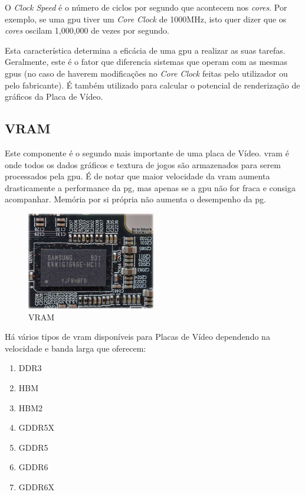 \documentclass{report}
\begin{document}
O \textit{Clock Speed} é o número de ciclos por segundo que acontecem nos \textit{cores}. Por exemplo, se uma \ac{gpu} tiver um \textit{Core Clock} de 1000MHz, isto quer dizer que os \textit{cores} oscilam 1,000,000 de vezes por segundo. 

Esta característica determina a eficácia de uma \ac{gpu} a realizar as suas tarefas. Geralmente, este é o fator que diferencia sistemas que operam com as mesmas \acp{gpu} ({\footnotesize no caso de haverem modificações no \textit{Core Clock} feitas pelo utilizador ou pelo fabricante}). É também utilizado para calcular o potencial de renderização de gráficos da Placa de Vídeo.
\clearpage

\subsection{VRAM}
\label{sec.mem}
Este componente é o segundo mais importante de uma placa de Vídeo. \ac{vram} é onde todos os dados gráficos e textura de jogos são armazenados para serem processados pela \ac{gpu}. É de notar que maior velocidade da \ac{vram} aumenta drasticamente a performance da \ac{pg}, mas apenas se a \ac{gpu} não for fraca e consiga acompanhar. Memória por si própria não aumenta o desempenho da \ac{pg}.

\begin{figure}[h]
\centering
\includegraphics[width=0.5\textwidth]{mem.jpg}
\caption{VRAM}
\label{fig:vram}
\end{figure}

Há vários tipos de \ac{vram} disponíveis para Placas de Vídeo dependendo na velocidade e banda larga que oferecem:
\begin{enumerate}
  \item DDR3
  \item HBM
  \item HBM2
  \item GDDR5X
  \item GDDR5
  \item GDDR6
  \item GDDR6X
\end{enumerate}
\end{document}
